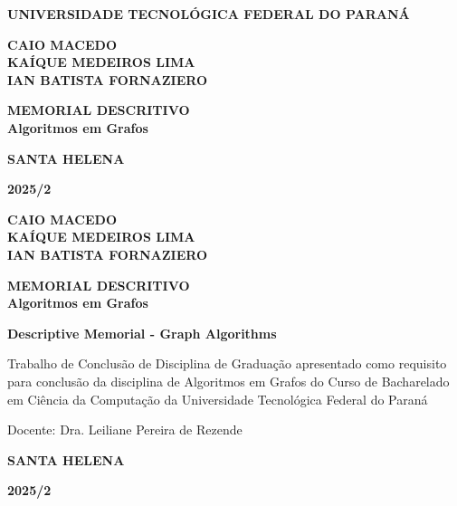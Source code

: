 \newcommand{\universidade}{UNIVERSIDADE TECNOLÓGICA FEDERAL DO PARANÁ}
\newcommand{\autores}{CAIO MACEDO\\ KAÍQUE MEDEIROS LIMA\\ IAN BATISTA FORNAZIERO}
\newcommand{\titulo}{MEMORIAL DESCRITIVO\\Algoritmos em Grafos}
\newcommand{\english}{Descriptive Memorial - Graph Algorithms}
\newcommand{\docente}{Dra. Leiliane Pereira de Rezende}
\newcommand{\cidade}{SANTA HELENA}
\newcommand{\periodo}{2025/2}



\begin{titlepage}
	\centering
	{\bf \universidade\par}
	\vspace{4cm}
	{\bf\autores\par}
	\vspace{6cm}
	{\bf\titulo\par}
	\vspace{9cm}
	{\bf\cidade\par}
	{\bf\periodo\par}
	\newpage

	{\bf\autores\par}
	\vspace{3.5cm}
	{\bf\titulo\par}
	\vspace{2cm}
	{\bf\english\par}
	\vspace{3cm}
	\begin{flushright} %
		\begin{minipage}{0.5\textwidth} %
			\justifying %
			\noindent
			Trabalho de Conclusão de Disciplina de
			Graduação apresentado como requisito para
			conclusão da disciplina de Algoritmos em
			Grafos do Curso de Bacharelado em Ciência
			da Computação da Universidade Tecnológica
			Federal do Paraná

			\vspace{1em}
			\noindent
			Docente: Dra. Leiliane Pereira de Rezende
		\end{minipage}
	\end{flushright}
	\vspace{5cm}
	{\bf\cidade\par}
	{\bf\periodo\par}
	\thispagestyle{empty}
\end{titlepage}
\newpage
\setcounter{page}{1}
